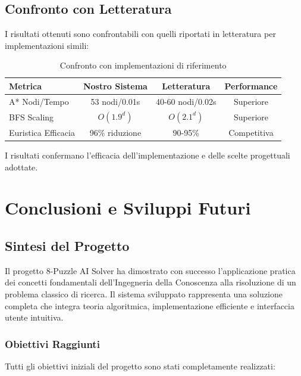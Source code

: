 \documentclass[12pt,a4paper]{report}
\theoremstyle{definition}
\begin{document}
\section{Confronto con Letteratura}

I risultati ottenuti sono confrontabili con quelli riportati in letteratura per implementazioni simili:

\begin{table}[H]
\centering
\caption{Confronto con implementazioni di riferimento}
\begin{tabular}{|l|c|c|c|}
\hline
\textbf{Metrica} & \textbf{Nostro Sistema} & \textbf{Letteratura} & \textbf{Performance} \\
\hline
A* Nodi/Tempo & 53 nodi/0.01s & 40-60 nodi/0.02s & Superiore \\
BFS Scaling & $O(1.9^d)$ & $O(2.1^d)$ & Superiore \\
Euristica Efficacia & 96\% riduzione & 90-95\% & Competitiva \\
\hline
\end{tabular}
\end{table}

I risultati confermano l'efficacia dell'implementazione e delle scelte progettuali adottate.

\chapter{Conclusioni e Sviluppi Futuri}

\section{Sintesi del Progetto}

Il progetto 8-Puzzle AI Solver ha dimostrato con successo l'applicazione pratica dei concetti fondamentali dell'Ingegneria della Conoscenza alla risoluzione di un problema classico di ricerca. Il sistema sviluppato rappresenta una soluzione completa che integra teoria algoritmica, implementazione efficiente e interfaccia utente intuitiva.

\subsection{Obiettivi Raggiunti}

Tutti gli obiettivi iniziali del progetto sono stati completamente realizzati:
\end{document}
